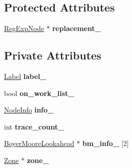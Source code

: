 \subsection*{Protected Attributes}
\begin{DoxyCompactItemize}
\item 
\hyperlink{classv8_1_1internal_1_1_reg_exp_node}{Reg\+Exp\+Node} $\ast$ {\bfseries replacement\+\_\+}\hypertarget{classv8_1_1internal_1_1_reg_exp_node_aac19aaa0fa38bce51ee5b9977c9cf2c5}{}\label{classv8_1_1internal_1_1_reg_exp_node_aac19aaa0fa38bce51ee5b9977c9cf2c5}

\end{DoxyCompactItemize}
\subsection*{Private Attributes}
\begin{DoxyCompactItemize}
\item 
\hyperlink{classv8_1_1internal_1_1_label}{Label} {\bfseries label\+\_\+}\hypertarget{classv8_1_1internal_1_1_reg_exp_node_a4fbedfc648b29620ba0a7d87a6eeea39}{}\label{classv8_1_1internal_1_1_reg_exp_node_a4fbedfc648b29620ba0a7d87a6eeea39}

\item 
bool {\bfseries on\+\_\+work\+\_\+list\+\_\+}\hypertarget{classv8_1_1internal_1_1_reg_exp_node_a3a1502c180972f2191863d4c480ebdc9}{}\label{classv8_1_1internal_1_1_reg_exp_node_a3a1502c180972f2191863d4c480ebdc9}

\item 
\hyperlink{structv8_1_1internal_1_1_node_info}{Node\+Info} {\bfseries info\+\_\+}\hypertarget{classv8_1_1internal_1_1_reg_exp_node_ac4b8309aa1d12e6143cddb360e77f72b}{}\label{classv8_1_1internal_1_1_reg_exp_node_ac4b8309aa1d12e6143cddb360e77f72b}

\item 
int {\bfseries trace\+\_\+count\+\_\+}\hypertarget{classv8_1_1internal_1_1_reg_exp_node_ae7ee40d270dee0772674605d150ca812}{}\label{classv8_1_1internal_1_1_reg_exp_node_ae7ee40d270dee0772674605d150ca812}

\item 
\hyperlink{classv8_1_1internal_1_1_boyer_moore_lookahead}{Boyer\+Moore\+Lookahead} $\ast$ {\bfseries bm\+\_\+info\+\_\+} \mbox{[}2\mbox{]}\hypertarget{classv8_1_1internal_1_1_reg_exp_node_a32a3c84bd6ac61f8277ca16b902175fd}{}\label{classv8_1_1internal_1_1_reg_exp_node_a32a3c84bd6ac61f8277ca16b902175fd}

\item 
\hyperlink{classv8_1_1internal_1_1_zone}{Zone} $\ast$ {\bfseries zone\+\_\+}\hypertarget{classv8_1_1internal_1_1_reg_exp_node_a0bb4f21f69f53894e766a74a9db5a908}{}\label{classv8_1_1internal_1_1_reg_exp_node_a0bb4f21f69f53894e766a74a9db5a908}

\end{DoxyCompactItemize}
